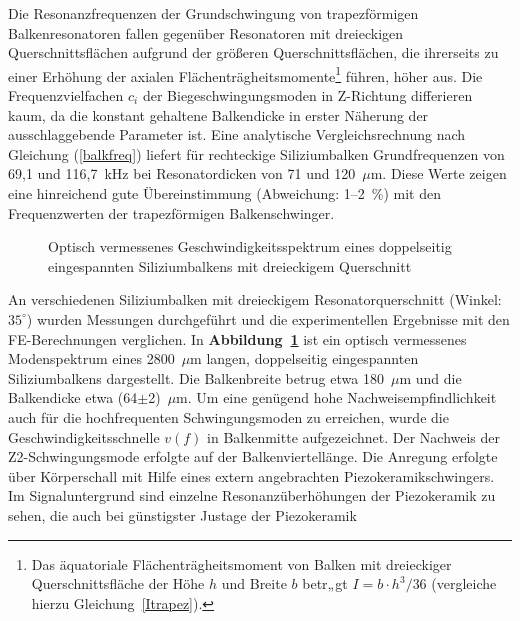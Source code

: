 Die Resonanzfrequenzen der Grundschwingung von trapezförmigen
Balkenresonatoren fallen gegenüber Resonatoren mit dreieckigen
Querschnittsflächen aufgrund der größeren Querschnittsflächen, die
ihrerseits zu einer Erhöhung der axialen
Flächenträgheitsmomente\footnote{Das äquatoriale Flächenträgheitsmoment
von Balken mit dreieckiger Querschnittsfläche der Höhe $h$ und Breite $b$
betr„gt $I=b \cdot h^{3}/36$ (vergleiche hierzu Gleichung~\ref{Itrapez}).}
führen, höher aus.
Die Frequenzvielfachen $c_{i}$ der Biegeschwingungsmoden in Z-Richtung
differieren kaum, da die konstant gehaltene Balkendicke in erster Näherung
der ausschlaggebende Parameter ist. Eine analytische Vergleichsrechnung nach
Gleichung (\ref{balkfreq}) liefert für rechteckige Siliziumbalken
Grundfrequenzen von 69,1 und 116,7~kHz bei
Resonatordicken von 71 und 120~$\mu$m. Diese Werte zeigen eine hinreichend
gute Übereinstimmung (Abweichung: 1--2~\%) mit den Frequenzwerten der
trapezförmigen Balkenschwinger.\\
%
\begin{figure}[htb]

\begin{center}

\setabbssi
\end{center}
\caption{\label{abbquerschspek}
 Optisch vermessenes Geschwindigkeitsspektrum eines doppelseitig
 eingespannten Siliziumbalkens mit dreieckigem Querschnitt}
\end{figure}
An verschiedenen Siliziumbalken mit dreieckigem Resonatorquerschnitt
(Winkel: $35^{\circ}$) wurden Messungen durchgeführt und die experimentellen
Ergebnisse mit den FE-Berechnungen verglichen. In
{\bf Abbildung~\ref{abbquerschspek}} ist ein optisch vermessenes
Modenspektrum eines 2800~$\mu$m langen, doppelseitig eingespannten
Siliziumbalkens dargestellt.
Die Balkenbreite betrug etwa 180~$\mu$m und die Balkendicke etwa
(64$\pm$2)~$\mu$m. Um eine genügend hohe Nachweisempfindlichkeit auch
für die hochfrequenten Schwingungsmoden zu erreichen, wurde die
Geschwindigkeitsschnelle $v(f)$ in Balkenmitte aufgezeichnet. Der Nachweis
der Z2-Schwingungsmode erfolgte auf der Balkenviertellänge.
Die Anregung erfolgte über Körperschall mit Hilfe eines extern angebrachten
Piezokeramikschwingers. Im Signaluntergrund sind einzelne
Resonanzüberhöhungen der Piezokeramik zu sehen, die auch bei
günstigster Justage der Piezokeramik
